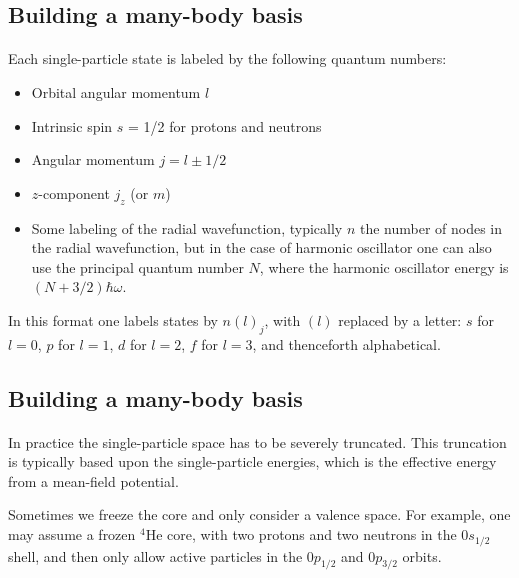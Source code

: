 \subsection*{Building a many-body basis}

\paragraph{}
Each single-particle state is labeled by the following quantum numbers: 

\begin{itemize}
\item Orbital angular momentum $l$

\item Intrinsic spin $s$ = 1/2 for protons and neutrons

\item Angular momentum $j = l \pm 1/2$

\item $z$-component $j_z$ (or $m$)

\item Some labeling of the radial wavefunction, typically $n$ the number of nodes in  the radial wavefunction, but in the case of harmonic oscillator one can also use the principal quantum number $N$, where the harmonic oscillator energy is $(N+3/2)\hbar \omega$.  
\end{itemize}

\noindent
In this format one labels states by $n(l)_j$, with $(l)$ replaced by a letter:
$s$ for $l=0$, $p$ for $l=1$, $d$ for $l=2$, $f$ for $l=3$, and thenceforth alphabetical.



\subsection*{Building a many-body basis}

\paragraph{}
 In practice the single-particle space has to be severely truncated.  This truncation is 
typically based upon the single-particle energies, which is the effective energy 
from a mean-field potential. 

Sometimes we freeze the core and only consider a valence space. For example, one 
may assume a frozen $^{4}\mbox{He}$ core, with two protons and two neutrons in the $0s_{1/2}$ 
shell, and then only allow active particles in the $0p_{1/2}$ and $0p_{3/2}$ orbits. 

